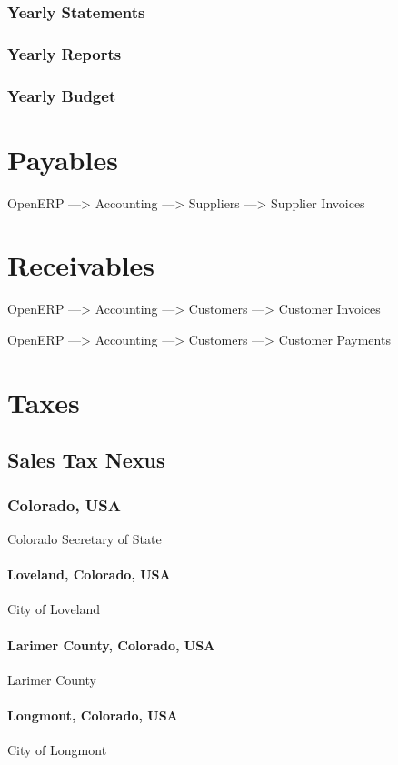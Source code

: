 \subsubsection{Yearly Statements}
\subsubsection{Yearly Reports}
\subsubsection{Yearly Budget}

\section{Payables}
OpenERP ---> Accounting ---> Suppliers ---> Supplier Invoices

\section{Receivables}
OpenERP ---> Accounting ---> Customers ---> Customer Invoices

OpenERP ---> Accounting ---> Customers ---> Customer Payments

\section{Taxes}
{ }
\subsection{Sales Tax Nexus}
{ }

\subsubsection{Colorado, USA}
Colorado Secretary of State

\paragraph{Loveland, Colorado, USA}
City of Loveland

\paragraph{Larimer County, Colorado, USA}
Larimer County

\paragraph{Longmont, Colorado, USA}
City of Longmont

